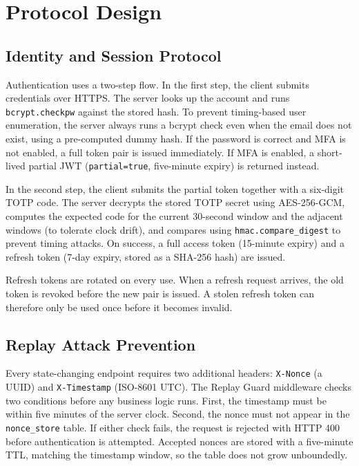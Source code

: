 \documentclass[11pt,a4paper]{article}
\begin{document}
\section{Protocol Design}

\subsection{Identity and Session Protocol}

Authentication uses a two-step flow. In the first step, the client submits
credentials over HTTPS. The server looks up the account and runs
\texttt{bcrypt.checkpw} against the stored hash. To prevent timing-based
user enumeration, the server always runs a bcrypt check even when the email
does not exist, using a pre-computed dummy hash. If the password is correct
and MFA is not enabled, a full token pair is issued immediately. If MFA is
enabled, a short-lived partial JWT (\texttt{partial=true}, five-minute
expiry) is returned instead.

In the second step, the client submits the partial token together with a
six-digit TOTP code. The server decrypts the stored TOTP secret using
AES-256-GCM, computes the expected code for the current 30-second window
and the adjacent windows (to tolerate clock drift), and compares using
\texttt{hmac.compare\_digest} to prevent timing attacks. On success, a full
access token (15-minute expiry) and a refresh token (7-day expiry, stored
as a SHA-256 hash) are issued.

Refresh tokens are rotated on every use. When a refresh request arrives,
the old token is revoked before the new pair is issued. A stolen refresh
token can therefore only be used once before it becomes invalid.

\subsection{Replay Attack Prevention}

Every state-changing endpoint requires two additional headers:
\texttt{X-Nonce} (a UUID) and \texttt{X-Timestamp} (ISO-8601 UTC). The
Replay Guard middleware checks two conditions before any business logic
runs. First, the timestamp must be within five minutes of the server clock.
Second, the nonce must not appear in the \texttt{nonce\_store} table. If
either check fails, the request is rejected with HTTP 400 before
authentication is attempted. Accepted nonces are stored with a five-minute
TTL, matching the timestamp window, so the table does not grow unboundedly.
\end{document}
